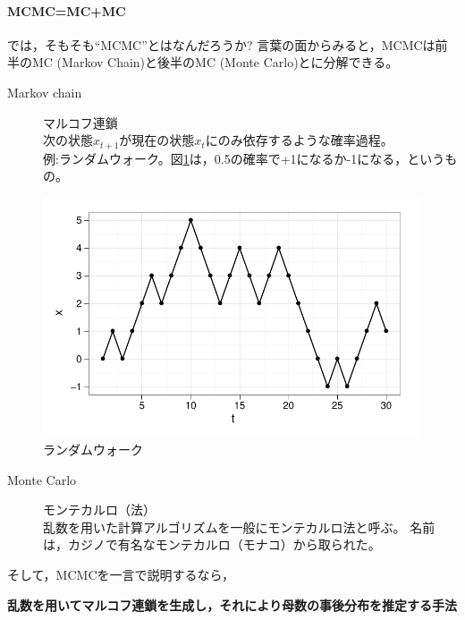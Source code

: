 \documentclass[11pt,uplatex]{jsarticle}
\begin{document}

\paragraph{MCMC=MC+MC}

では，そもそも``MCMC''とはなんだろうか?
言葉の面からみると，MCMCは前半のMC (Markov Chain)と後半のMC (Monte Carlo)とに分解できる。

\begin{description}
\item[Markov chain] マルコフ連鎖\\
次の状態$x_{t+1}$が現在の状態$x_{t}$にのみ依存するような確率過程。\\
例:ランダムウォーク。図\ref{random_walk_plot}は，0.5の確率で+1になるか-1になる，というもの。
\end{description}

\begin{figure}[hbtp]
  \begin{center}
    \includegraphics[bb=0 0 380 240, clip, width=300 bp]{random_walk2.pdf}
  \end{center}
  \caption{ランダムウォーク}
  \label{random_walk_plot}
\end{figure}

\begin{description}
\item[Monte Carlo] モンテカルロ（法）\\
乱数を用いた計算アルゴリズムを一般にモンテカルロ法と呼ぶ。
名前は，カジノで有名なモンテカルロ（モナコ）から取られた。
\end{description}

そして，MCMCを一言で説明するなら，

\vspace{2zw}
\hspace{10mm}
\begin{minipage}{110mm}
\begin{breakbox}
\noindent
{\large\bf 乱数を用いてマルコフ連鎖を生成し，それにより母数の事後分布を推定する手法}
\end{breakbox}
\end{minipage}
\vspace{2zw}
\end{document}
